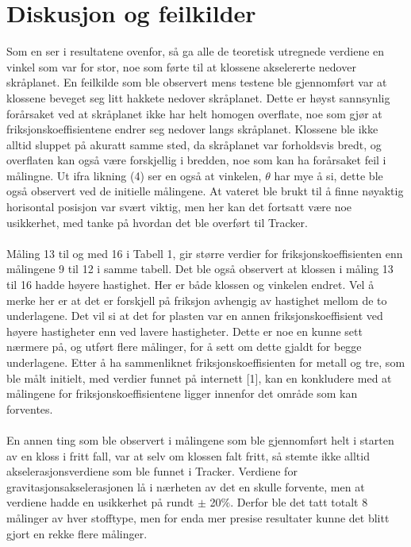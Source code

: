 \documentclass[10pt,a4paper]{report}
\begin{document}
\section*{Diskusjon og feilkilder}
Som en ser i resultatene ovenfor, så ga alle de teoretisk utregnede verdiene en vinkel som var for stor, noe som førte til at klossene akselererte nedover skråplanet. En feilkilde som ble observert mens testene ble gjennomført var at klossene beveget seg litt hakkete nedover skråplanet. Dette er høyst sannsynlig forårsaket ved at skråplanet ikke har helt homogen overflate, noe som gjør at friksjonskoeffisientene endrer seg nedover langs skråplanet. Klossene ble ikke alltid sluppet på akuratt samme sted, da skråplanet var forholdsvis bredt, og overflaten kan også være forskjellig i bredden, noe som kan ha forårsaket feil i målingne. Ut ifra likning (4) ser en også at vinkelen, $\theta$ har mye å si, dette ble også observert ved de initielle målingene. At vateret ble brukt til å finne nøyaktig horisontal posisjon var svært viktig, men her kan det fortsatt være noe usikkerhet, med tanke på hvordan det ble overført til Tracker.\\\\
Måling 13 til og med 16 i Tabell 1, gir større verdier for friksjonskoeffisienten enn målingene 9 til 12 i samme tabell. Det ble også observert at klossen i måling 13 til 16 hadde høyere hastighet. Her er både klossen og vinkelen endret. Vel å merke her er at det er forskjell på friksjon avhengig av hastighet mellom de to underlagene. Det vil si at det for plasten var en annen friksjonskoeffisient ved høyere hastigheter enn ved lavere hastigheter. Dette er noe en kunne sett nærmere på, og utført flere målinger, for å sett om dette gjaldt for begge underlagene. Etter å ha sammenliknet friksjonskoeffisienten for metall og tre, som ble målt initielt, med verdier funnet på internett [1], kan en konkludere med at målingene for friksjonskoeffisientene ligger innenfor det område som kan forventes.\\\\
En annen ting som ble observert i målingene som ble gjennomført helt i starten av en kloss i fritt fall, var at selv om klossen falt fritt, så stemte ikke alltid akselerasjonsverdiene som ble funnet i Tracker. Verdiene for gravitasjonsakselerasjonen lå i nærheten av det en skulle forvente, men at verdiene hadde en usikkerhet på rundt $\pm$ 20$\%$. Derfor ble det tatt totalt 8 målinger av hver stofftype, men for enda mer presise resultater kunne det blitt gjort en rekke flere målinger.
\end{document}
